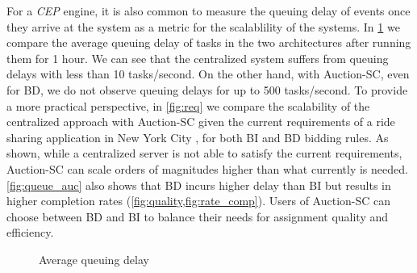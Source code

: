 For a \emph{CEP} engine, it is also common to measure the queuing delay of events \cite{Wu06} once they arrive at the system as a metric for the scalablility of the systems. In \cref{fig:queue} we compare the average queuing delay of tasks in the two architectures after running them for 1 hour. We can see that the centralized system suffers from queuing delays with less than 10 tasks/second. On the other hand, with Auction-SC, even for BD, we do not observe queuing delays for up to 500 tasks/second. To provide a more practical perspective, in \cref{fig:req} we compare the scalability of the centralized approach with Auction-SC given the current requirements of a ride sharing application in New York City \cite{NYCTaxi}, for both BI and BD bidding rules. As shown, while a centralized server is not able to satisfy the current requirements, Auction-SC can scale orders of magnitudes higher than what currently is needed. \cref{fig:queue_auc} also shows that BD incurs higher delay than BI but results in higher completion rates (\cref{fig:quality,fig:rate_comp}). Users of Auction-SC can choose between BD and BI to balance their needs for assignment quality and efficiency.

\begin{figure}[h]
    \centering
    \vspace{-0.15in}
    \caption{Average queuing delay}
    \label{fig:queue}
\end{figure}

